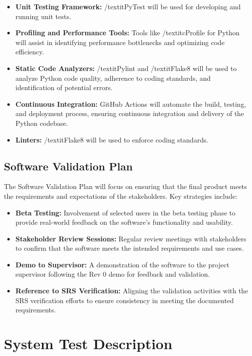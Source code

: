 \documentclass[12pt, titlepage]{article}
\begin{document}
\begin{itemize}
    \item \textbf{Unit Testing Framework:} /textit{PyTest} will be used for developing and running unit tests.
    \item \textbf{Profiling and Performance Tools:} Tools like /textit{cProfile} for Python will assist in identifying performance bottlenecks and optimizing code efficiency.
    \item \textbf{Static Code Analyzers:} /textit{Pylint} and /textit{Flake8} will be used to analyze Python code quality, adherence to coding standards, and identification of potential errors.
    \item \textbf{Continuous Integration:} GitHub Actions will automate the build, testing, and deployment process, ensuring continuous integration and delivery of the Python codebase.
    \item \textbf{Linters:} /textit{Flake8} will be used to enforce coding standards.
\end{itemize}


\subsection{Software Validation Plan}

The Software Validation Plan will focus on ensuring that the final product meets the requirements and expectations of the stakeholders. Key strategies include:

\begin{itemize}
    \item \textbf{Beta Testing:} Involvement of selected users in the beta testing phase to provide real-world feedback on the software's functionality and usability.
    \item \textbf{Stakeholder Review Sessions:} Regular review meetings with stakeholders to confirm that the software meets the intended requirements and use cases.
    \item \textbf{Demo to Supervisor:} A demonstration of the software to the project supervisor following the Rev 0 demo for feedback and validation.
    \item \textbf{Reference to SRS Verification:} Aligning the validation activities with the SRS verification efforts to ensure consistency in meeting the documented requirements.
\end{itemize}

\section{System Test Description}
	
\end{document}
